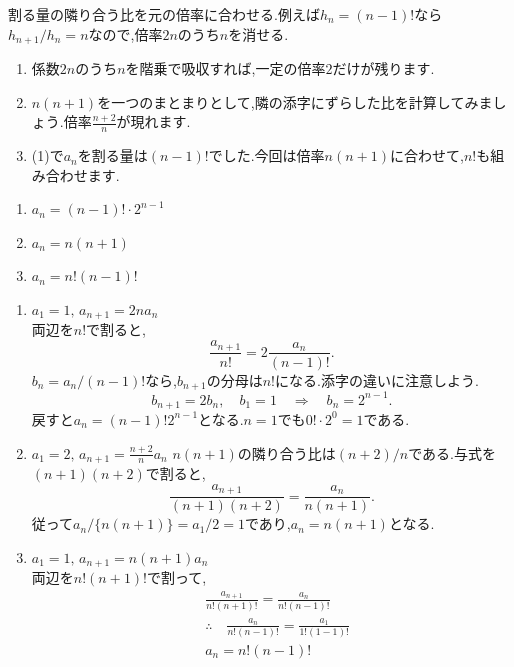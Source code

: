     \noindent{}\par\nobreak
    割る量の隣り合う比を元の倍率に合わせる.例えば$h_n=(n-1)!$なら$h_{n+1}/h_n=n$なので,倍率$2n$のうち$n$を消せる.
    \begin{enumerate}[label=(\arabic*),parsep=3pt,format=\bookitemlink{example-ratio-1}{hint}{problem}]
      \item 係数$2n$のうち$n$を階乗で吸収すれば,一定の倍率$2$だけが残ります.
      \item $n(n+1)$を一つのまとまりとして,隣の添字にずらした比を計算してみましょう.倍率$\frac{n+2}{n}$が現れます.
      \item (1)で$a_n$を割る量は$(n-1)!$でした.今回は倍率$n(n+1)$に合わせて,$n!$も組み合わせます.
    \end{enumerate}

    \noindent{}\par\nobreak
    \begin{enumerate}[label=(\arabic*),parsep=3pt,format=\bookitemlink{example-ratio-1}{answer}{problem}]
      \item $\displaystyle a_n=(n-1)!\cdot 2^{n-1}$
      \item $\displaystyle a_n=n(n+1)$
      \item $\displaystyle a_n=n!(n-1)!$
    \end{enumerate}

    \noindent{}\par\nobreak
    \begin{enumerate}[label=(\arabic*),parsep=3pt,format=\bookitemlink{example-ratio-1}{solution}{problem}]
      \item $\displaystyle a_1=1,\, a_{n+1}=2na_n$\\
            両辺を$n!$で割ると,
            \[
              \frac{a_{n+1}}{n!}=2\frac{a_n}{(n-1)!}.
            \]
            $b_n=a_n/(n-1)!$なら,$b_{n+1}$の分母は$n!$になる.添字の違いに注意しよう.
            \[
              b_{n+1}=2b_n,\quad b_1=1\quad\Longrightarrow\quad b_n=2^{n-1}.
            \]
            戻すと$a_n=(n-1)!2^{n-1}$となる.$n=1$でも$0!\cdot2^0=1$である.

      \item $\displaystyle a_1=2,\, a_{n+1}=\frac{n+2}{n}a_n$
            $n(n+1)$の隣り合う比は$(n+2)/n$である.与式を$(n+1)(n+2)$で割ると,
            \[
              \frac{a_{n+1}}{(n+1)(n+2)}=\frac{a_n}{n(n+1)}.
            \]
            従って$a_n/\{n(n+1)\}=a_1/2=1$であり,$a_n=n(n+1)$となる.
      \item $\displaystyle a_1=1,\, a_{n+1}=n(n+1)a_n$\\
              両辺を$n!(n+1)!$で割って,
            \begin{align*}
              &\frac{a_{n+1}}{n!(n+1)!}=\frac{a_n}{n!(n-1)!}\\
              &\therefore \quad \frac{a_n}{n!(n-1)!}=\frac{a_1}{1!(1-1)!}\\
              &a_n=n!(n-1)!
            \end{align*}
    \end{enumerate}

